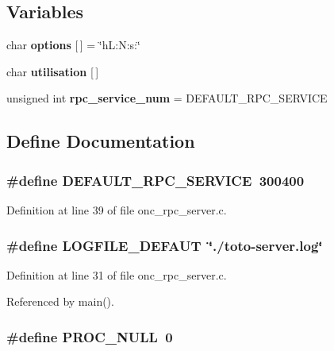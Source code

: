 \subsection*{Variables}
\begin{CompactItemize}
\item 
char {\bf options} [$\,$] = \char`\"{}h\-L:N:s:\char`\"{}
\item 
char {\bf utilisation} [$\,$]
\item 
unsigned int {\bf rpc\_\-service\_\-num} = DEFAULT\_\-RPC\_\-SERVICE
\end{CompactItemize}


\subsection{Define Documentation}
\subsubsection{\setlength{\rightskip}{0pt plus 5cm}\#define DEFAULT\_\-RPC\_\-SERVICE\ 300400}\label{onc__rpc__server_8c_a3}




Definition at line 39 of file onc\_\-rpc\_\-server.c.
\subsubsection{\setlength{\rightskip}{0pt plus 5cm}\#define LOGFILE\_\-DEFAUT\ \char`\"{}./toto-{\bf server}.log\char`\"{}}\label{onc__rpc__server_8c_a0}




Definition at line 31 of file onc\_\-rpc\_\-server.c.

Referenced by main().
\subsubsection{\setlength{\rightskip}{0pt plus 5cm}\#define PROC\_\-NULL\ 0}\label{onc__rpc__server_8c_a7}




